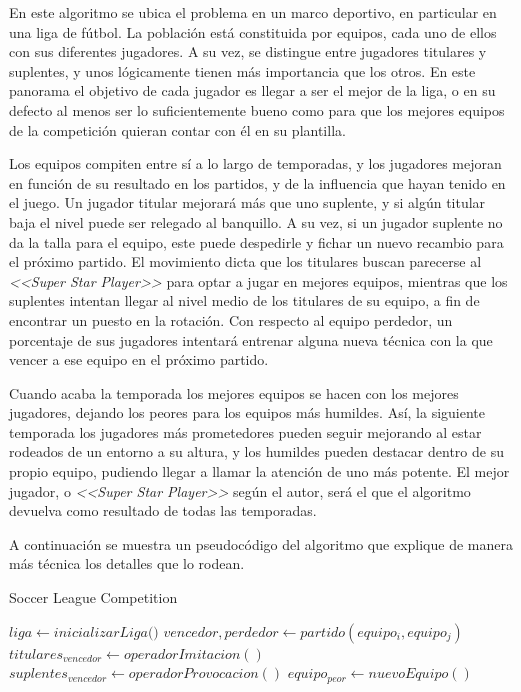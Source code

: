 En este algoritmo se ubica el problema en un marco deportivo, en particular en una liga de fútbol. La población está constituida por equipos, cada uno de ellos con sus diferentes jugadores. A su vez, se distingue entre jugadores titulares y suplentes, y unos lógicamente tienen más importancia que los otros. En este panorama el objetivo de cada jugador es llegar a ser el mejor de la liga, o en su defecto al menos ser lo suficientemente bueno como para que los mejores equipos de la competición quieran contar con él en su plantilla.

Los equipos compiten entre sí a lo largo de temporadas, y los jugadores mejoran en función de su resultado en los partidos, y de la influencia que hayan tenido en el juego. Un jugador titular mejorará más que uno suplente, y si algún titular baja el nivel puede ser relegado al banquillo. A su vez, si un jugador suplente no da la talla para el equipo, este puede despedirle y fichar un nuevo recambio para el próximo partido. El movimiento dicta que los titulares buscan parecerse al \textit{<<Super Star Player>>} para optar a jugar en mejores equipos, mientras que los suplentes intentan llegar al nivel medio de los titulares de su equipo, a fin de encontrar un puesto en la rotación. Con respecto al equipo perdedor, un porcentaje de sus jugadores intentará entrenar alguna nueva técnica con la que vencer a ese equipo en el próximo partido.

Cuando acaba la temporada los mejores equipos se hacen con los mejores jugadores, dejando los peores para los equipos más humildes. Así, la siguiente temporada los jugadores más prometedores pueden seguir mejorando al estar rodeados de un entorno a su altura, y los humildes pueden destacar dentro de su propio equipo, pudiendo llegar a llamar la atención de uno más potente. El mejor jugador, o \textit{<<Super Star Player>>} según el autor, será el que el algoritmo devuelva como resultado de todas las temporadas.

A continuación se muestra un pseudocódigo del algoritmo que explique de manera más técnica los detalles que lo rodean.

\begin{algorithm}
	\caption{Soccer League Competition}
	\begin{algorithmic}[1]
		\State $liga \gets \textit{inicializarLiga()}$
		\State $vencedor, perdedor \gets partido(equipo_i, equipo_j)$
		\State $titulares_{vencedor} \gets operadorImitacion()$
		\State $suplentes_{vencedor} \gets operadorProvocacion()$
		\EndFor
		\State $equipo_{peor} \gets nuevoEquipo()$
		\EndIf
		\EndWhile
	\end{algorithmic}
\end{algorithm}

